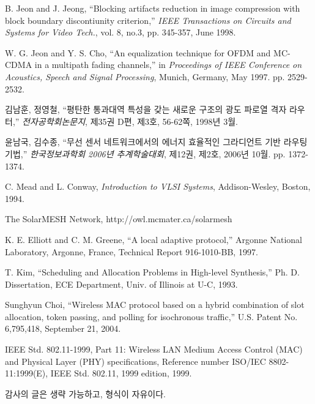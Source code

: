 \documentclass[oneside,ko,phd]{snueethesis}
\begin{document}
\begin{thebibliography}{00}

     B. Jeon and J. Jeong, ``Blocking artifacts
    reduction in image compression with block boundary discontiunity
    criterion,'' {\em IEEE Transactions on Circuits and Systems for
    Video Tech.}, vol. 8, no.3, pp. 345-357, June 1998.

     W. G. Jeon and Y. S. Cho, ``An equalization
    technique for OFDM and MC-CDMA in a multipath fading channels,''
    in {\em Proceedings of IEEE Conference on Acoustics, Speech and
    Signal Processing}, Munich, Germany, May 1997. pp. 2529-2532.

     김남훈, 정영철, ``평탄한 통과대역 특성을 갖는
    새로운 구조의 광도 파로열 격자 라우터,'' {\em 전자공학회논문지},
    제35권 D편, 제3호, 56-62쪽, 1998년 3월.

     윤남국, 김수종, ``무선 센서 네트워크에서의 에너지
    효율적인 그라디언트 기반 라우팅 기법,'' {\em 한국정보과학회
    2006년 추계학술대회}, 제12권, 제2호, 2006년 10월. pp.
    1372-1374.

     C. Mead and L. Conway, {\em Introduction to VLSI
    Systems}, Addison-Wesley, Boston, 1994.

     The SolarMESH Network,
    http://owl.mcmater.ca/solarmesh

     K. E. Elliott and C. M. Greene, ``A local adaptive
    protocol,'' Argonne National Laboratory, Argonne, France,
    Technical Report 916-1010-BB, 1997.

     T. Kim, ``Scheduling and Allocation Problems in
    High-level Synthesis,'' Ph. D. Dissertation, ECE Department,
    Univ. of Illinois at U-C, 1993.

     Sunghyun Choi, ``Wireless MAC protocol based on a
    hybrid combination of slot allocation, token passing, and
    polling for isochronous traffic,'' U.S. Patent No. 6,795,418,
    September 21, 2004.

     IEEE Std. 802.11-1999, Part 11: Wireless LAN
    Medium Access Control (MAC) and Physical Layer (PHY)
    specifications, Reference number ISO/IEC 8802-11:1999(E), IEEE
    Std. 802.11, 1999 edition, 1999.

\end{thebibliography}

\begin{abstractalt}
\noindent
\lipsum[1-3]
\end{abstractalt}

\acknowledgement
감사의 글은 생략 가능하고, 형식이 자유이다.
\end{document}
